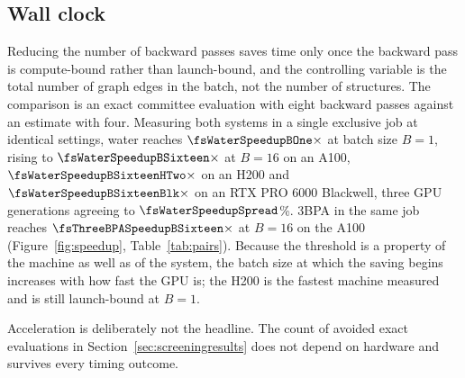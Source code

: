 \subsection{Wall clock}
\label{sec:wallclock}

Reducing the number of backward passes saves time only once the backward pass
is compute-bound rather than launch-bound, and the controlling variable is the
total number of graph edges in the batch, not the number of structures. The
comparison is an exact committee evaluation with eight backward passes against
an estimate with four. Measuring both systems in a single exclusive job at
identical settings, water reaches $\fsWaterSpeedupBOne\times$ at batch size
$B=1$, rising to $\fsWaterSpeedupBSixteen\times$ at $B=16$ on an A100,
$\fsWaterSpeedupBSixteenHTwo\times$ on an H200 and
$\fsWaterSpeedupBSixteenBlk\times$ on an RTX PRO 6000 Blackwell, three GPU
generations agreeing to $\fsWaterSpeedupSpread$\%. 3BPA in the same job
reaches $\fsThreeBPASpeedupBSixteen\times$ at $B=16$ on the A100
(Figure~\ref{fig:speedup}, Table~\ref{tab:pairs}). Because the threshold is a
property of the machine as well as of the system, the batch size at which the
saving begins increases with how fast the GPU is; the H200 is the fastest
machine measured and is still launch-bound at $B=1$.

Acceleration is deliberately not the headline. The count of avoided exact
evaluations in Section~\ref{sec:screeningresults} does not depend on hardware
and survives every timing outcome.
